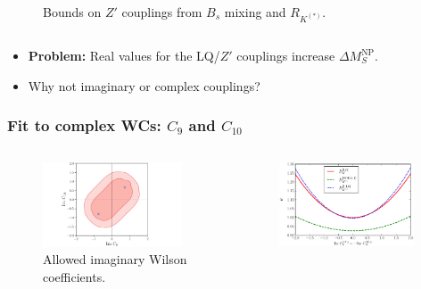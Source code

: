 \documentclass[mathserif, 10pt]{beamer}
\begin{document}
\begin{frame}
\begin{columns}
\begin{column}[t]{0.48\textwidth}
\begin{figure}
                \small{Bounds on $Z'$ couplings from $B_s$ mixing and $R_{K^{(*)}}$. \protect\footnotemark[8] }
            \end{figure}
        \end{column}
    \end{columns}
    \begin{itemize}
        \item \textbf{Problem:} Real values for the LQ/$Z'$ couplings increase $\Delta M_S^\mathrm{NP}$.
        \item Why not \alert{imaginary or complex} couplings?
    \end{itemize}
\end{frame}

\begin{frame}\frametitle{Fit to complex WCs: $C_9$ and $C_{10}$}
    \begin{columns}
        \begin{column}[t]{0.48\textwidth}
            \begin{figure}
                \centering
                \includegraphics[width=0.95\textwidth]{figures/fitim_C9C10.pdf}\\
                Allowed imaginary Wilson coefficients.
            \end{figure}
        \end{column}
        \begin{column}[t]{0.48\textwidth}
            \begin{figure}
                \centering
                \includegraphics[width=0.95\textwidth]{figures/RK_im.pdf}\\

\end{figure}
\end{column}
\end{columns}
\end{frame}
\end{document}
